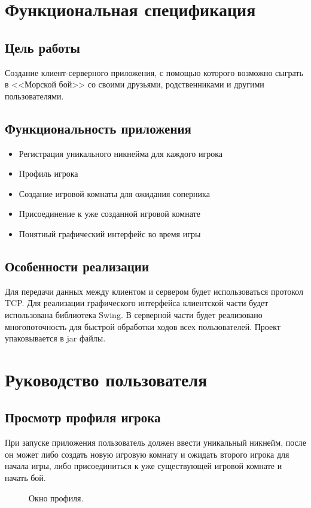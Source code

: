 \documentclass{article}
\begin{document}
	\section {Функциональная спецификация}
		\subsection{Цель работы}
			Создание клиент-серверного приложения, с помощью 
			которого возможно сыграть в <<Морской бой>> со своими друзьями, родственниками и другими пользователями.
		\subsection{Функциональность приложения}
			\begin{itemize}
				\item {Регистрация уникального никнейма для каждого игрока}
				\item {Профиль игрока}
				\item {Создание игровой комнаты для ожидания соперника}
				\item {Присоединение к уже созданной игровой комнате}
				\item {Понятный графический интерфейс во время игры}
			\end{itemize}
		\subsection{Особенности реализации}
			Для передачи данных между клиентом и сервером будет использоваться протокол TCP. Для реализации графического интерфейса клиентской части будет использована библиотека Swing. В серверной части будет реализовано многопоточность для быстрой обработки ходов всех пользователей. Проект упаковывается в jar файлы.
	\section{Руководство пользователя}
		\subsection{Просмотр профиля игрока}
			При запуске приложения пользователь должен ввести уникальный никнейм, после он может либо создать новую игровую комнату и ожидать второго игрока для начала игры, либо присоединиться к уже существующей игровой комнате и начать бой.
			\begin{figure}[H]
				\caption{Окно профиля.\label{profile}}
			\end{figure}
\end{document}
